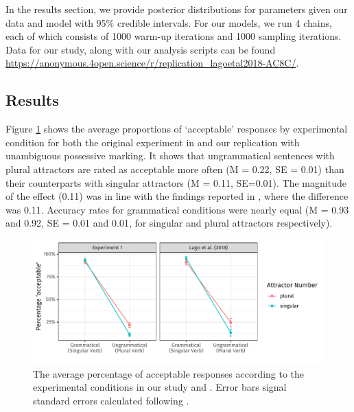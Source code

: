\documentclass[brill,linguex]{glossa}\usepackage[]{graphicx}\usepackage[]{color}
\makeatletter
\def\maxwidth{ %
  \ifdim\Gin@nat@width>\linewidth
    \linewidth
  \else
    \Gin@nat@width
  \fi
}
\newenvironment{knitrout}{}{} %
\makeatother
\begin{document}
In the results section, we provide posterior distributions for parameters given our data and model with 95\% credible intervals. For our models, we run 4 chains, each of which consists of 1000 warm-up iterations and 1000 sampling iterations. Data for our study, along with our analysis scripts can be found \url{https://anonymous.4open.science/r/replication_lagoetal2018-AC8C/}.


\subsection{Results}



Figure \ref{fig:AverageResponses} shows the average proportions of `acceptable' responses by experimental condition for both the original experiment in \citet{LagoEtAl:2019} and our replication with unambiguous possessive marking. It shows that ungrammatical sentences with plural attractors are rated as acceptable more often (M = 0.22, SE = 0.01) than their counterparts with singular attractors (M = 0.11, SE=0.01). The magnitude of the effect (0.11) was in line with the findings reported in \citet{LagoEtAl:2019}, where the difference was 0.11. Accuracy rates for grammatical conditions were nearly equal (M = 0.93 and 0.92, SE = 0.01 and 0.01, for singular and plural attractors respectively).

\begin{figure}[hbt!]
\centering

\begin{knitrout}
\color{fgcolor}

{\centering \includegraphics[width=\maxwidth]{figure/AverageResponses-1} 

}


\end{knitrout}

\caption{The average percentage of acceptable responses according to the experimental conditions in our study and \citet{LagoEtAl:2019}. Error bars signal standard errors calculated following \citet{Cousineau:2007}.}
\label{fig:AverageResponses}
\end{figure}
\end{document}

